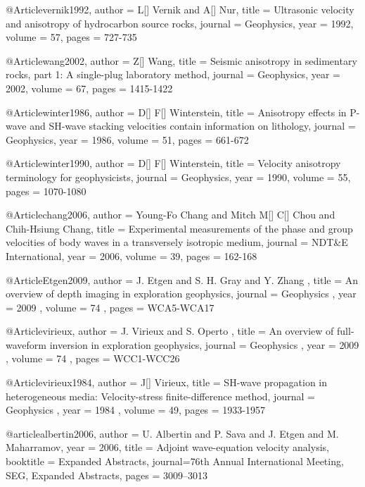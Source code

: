 @Article{vernik1992,
  author = 	 {L[] Vernik and A[] Nur},
  title = 	 {Ultrasonic velocity and anisotropy of hydrocarbon source rocks},
  journal = 	 {Geophysics},
  year = 	 1992,
  volume = 	 57,
  pages = 	 {727-735}}

@Article{wang2002,
  author = 	 {Z[] Wang},
  title = 	 {Seismic anisotropy in sedimentary rocks, part 1: A single-plug laboratory method},
  journal = 	 {Geophysics},
  year = 	 2002,
  volume = 	 67,
  pages = 	 {1415-1422}}


@Article{winter1986,
  author = 	 {D[] F[] Winterstein},
  title = 	 {Anisotropy effects in P-wave and SH-wave stacking velocities contain information on lithology},
  journal = 	 {Geophysics},
  year = 	 1986,
  volume = 	 51,
  pages = 	 {661-672}}

@Article{winter1990,
  author = 	 {D[] F[] Winterstein},
  title = 	 {Velocity anisotropy terminology for geophysicists},
  journal = 	 {Geophysics},
  year = 	 1990,
  volume = 	 55,
  pages = 	 {1070-1080}}

@Article{chang2006,
  author = 	 {Young-Fo Chang and Mitch M[] C[] Chou and Chih-Hsiung Chang},
  title = 	 {Experimental measurements of the phase and group velocities of body waves in a transversely isotropic medium},
  journal = 	 {NDT\&E International},
  year = 	 2006,
  volume = 	 39,
  pages = 	 {162-168}}



@Article{Etgen2009,
 author =  { J. Etgen and  S. H. Gray and Y. Zhang },
 title =   { An overview of depth imaging in exploration geophysics},
 journal = { Geophysics },
 year =    { 2009 },
 volume =  { 74 },
 pages =   { WCA5-WCA17 }
}

@Article{virieux,
 author =  { J. Virieux and S. Operto },
 title =   { An overview of full-waveform inversion in exploration geophysics},
 journal = { Geophysics },
 year =    { 2009 },
 volume =  { 74 },
 pages =   { WCC1-WCC26 }
}

@Article{virieux1984,
 author =  { J[] Virieux},
 title =   { SH-wave propagation in heterogeneous media: Velocity-stress finite-difference method},
 journal = { Geophysics },
 year =    { 1984 },
 volume =  { 49},
 pages =   { 1933-1957 }
}

@article{albertin2006,
  author = {U. Albertin and P. Sava and J. Etgen and M.
Maharramov},
  year = {2006},
  title = { Adjoint wave-equation velocity analysis},
  booktitle = {Expanded Abstracts},
  journal={76th Annual International Meeting, SEG, Expanded Abstracts},
  pages = {3009--3013}
}

